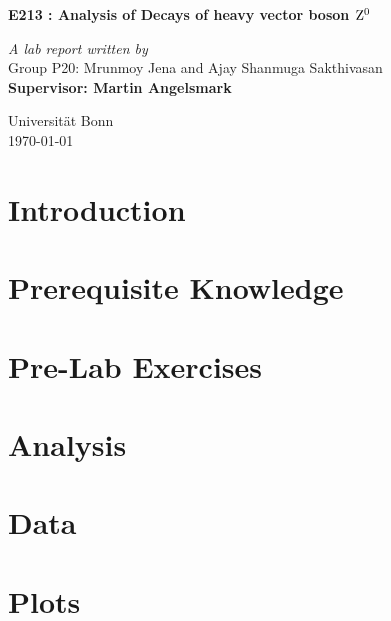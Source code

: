 \documentclass[a4paper]{report}
\begin{document}
\begin{onehalfspace}
\vspace*{0.5in}
\begin{center}
\begin{LARGE}
\textbf{E213 : Analysis of Decays of heavy vector boson $\rm Z^{0}$}\\ 
\end{LARGE}
\bigskip
\bigskip
\textit{A lab report written by}\\
Group P20: Mrunmoy Jena and Ajay Shanmuga Sakthivasan\\
\medskip
\textbf{Supervisor: Martin Angelsmark}\\
\vspace*{5in}
\begin{flushright}
Universit\"{a}t	Bonn\\
\today
\end{flushright}
\end{center}
\tableofcontents
\chapter*{Introduction}

\chapter{Prerequisite Knowledge}


\chapter{Pre-Lab Exercises}


\chapter{Analysis}


\end{onehalfspace}
\printbibliography[title = References]

\appendix
\chapter{Data}

\chapter{Plots}

\end{document}
